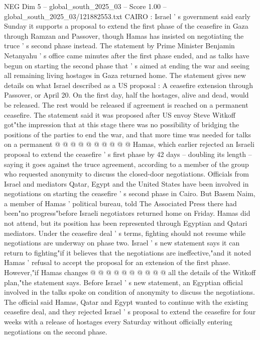 \begin{textsample}{NEG Dim 5 – global\_south\_2025\_03 – Score 1.00 – global\_south\_2025\_03/121882553.txt}  \label{ex:f5_neg_270}
CAIRO : Israel ' s government said early Sunday it supports a proposal to extend the first phase of the ceasefire in Gaza through Ramzan and Passover, though Hamas has insisted on negotiating the truce ' s second phase instead.
The statement by Prime Minister Benjamin Netanyahu ' s office came minutes after the first phase ended, and as talks have begun on starting the second phase that ' s aimed at ending the war and seeing all remaining living hostages in Gaza returned home.
The statement gives new details on what Israel described as a US proposal : A ceasefire extension through Passover, or April 20.
On the first day, half the hostages, alive and dead, would be released.
The rest would be released if agreement is reached on a permanent ceasefire.
The statement said it was proposed after US envoy Steve Witkoff got"the impression that at this stage there was no possibility of bridging the positions of the parties to end the war, and that more time was needed for talks on a permanent @ @ @ @ @ @ @ @ @ @ Hamas, which earlier rejected an Israeli proposal to extend the ceasefire ' s first phase by 42 days -- doubling its length -- saying it goes against the truce agreement, according to a member of the group who requested anonymity to discuss the closed-door negotiations.
Officials from Israel and mediators Qatar, Egypt and the United States have been involved in negotiations on starting the ceasefire ' s second phase in Cairo.
But Basem Naim, a member of Hamas ' political bureau, told The Associated Press there had been"no progress"before Israeli negotiators returned home on Friday.
Hamas did not attend, but its position has been represented through Egyptian and Qatari mediators.
Under the ceasefire deal ' s terms, fighting should not resume while negotiations are underway on phase two.
Israel ' s new statement says it can return to fighting"if it believes that the negotiations are ineffective,"and it noted Hamas ' refusal to accept the proposal for an extension of the first phase.
However,"if Hamas changes @ @ @ @ @ @ @ @ @ @ all the details of the Witkoff plan,"the statement says.
Before Israel ' s new statement, an Egyptian official involved in the talks spoke on condition of anonymity to discuss the negotiations.
The official said Hamas, Qatar and Egypt wanted to continue with the existing ceasefire deal, and they rejected Israel ' s proposal to extend the ceasefire for four weeks with a release of hostages every Saturday without officially entering negotiations on the second phase.

\end{textsample}
